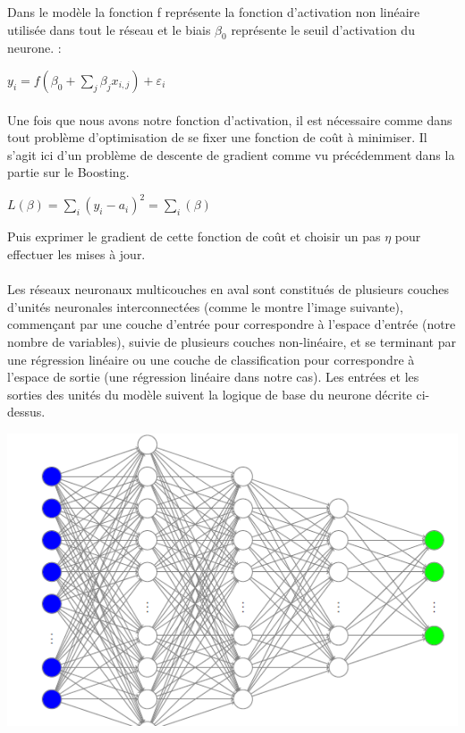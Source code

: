 \documentclass[14pt, openany]{article}
\begin{document}
Dans le modèle la fonction f représente la fonction d'activation non linéaire utilisée dans tout le réseau et le biais $\beta_{0} $ représente le seuil d'activation du neurone. :
\begin{center}
$y_{i}=f(\beta_{0} + \sum\limits_{j} \beta_{j}x_{i,j}) + \varepsilon_{i}$
\end{center}

\paragraph{}
Une fois que nous avons notre fonction d'activation, il est nécessaire comme dans tout problème d'optimisation de se fixer une fonction de coût à minimiser. Il s'agit ici d'un problème de descente de gradient comme vu précédemment dans la partie sur le Boosting.

\begin{center}
$L(\beta)=\sum\limits_{i}(y_{i}-a_{i})^{2}=\sum\limits_{i}(\beta)$
\end{center}

Puis exprimer le gradient de cette fonction de coût et choisir un pas $\eta$ pour effectuer les mises à jour.

\paragraph{}
Les réseaux neuronaux multicouches en aval sont constitués de plusieurs couches d'unités neuronales interconnectées (comme le montre l'image suivante), commençant par une couche d'entrée pour correspondre à l'espace d'entrée (notre nombre de variables), suivie de plusieurs couches non-linéaire, et se terminant par une régression linéaire ou une couche de classification pour correspondre à l'espace de sortie (une régression linéaire dans notre cas). Les entrées et les sorties des unités du modèle suivent la logique de base du neurone décrite ci-dessus.

\begin{center}
\includegraphics[scale=0.7]{Images/RN.png}
\end{center}
\end{document}
